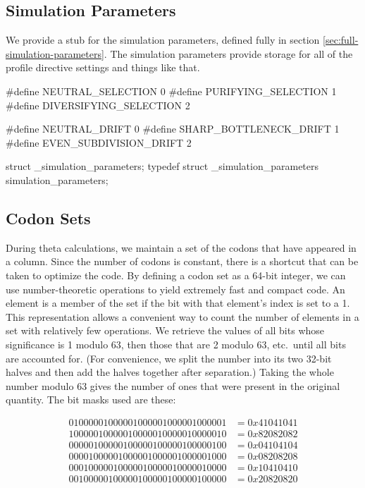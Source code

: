 \documentclass{article}
\begin{document}
    \subsection{Simulation Parameters}
      \label{sec:simulation-parameters}

      We provide a stub for the simulation parameters, defined fully in section
      \ref{sec:full-simulation-parameters}. The simulation parameters provide
      storage for all of the profile directive settings and things like that.

\begin{ccode}
#define NEUTRAL_SELECTION 0
#define PURIFYING_SELECTION 1
#define DIVERSIFYING_SELECTION 2

#define NEUTRAL_DRIFT 0
#define SHARP_BOTTLENECK_DRIFT 1
#define EVEN_SUBDIVISION_DRIFT 2

struct _simulation_parameters;
typedef struct _simulation_parameters simulation_parameters;
\end{ccode}

    \subsection{Codon Sets}
      \label{sec:codon-sets}

      During theta calculations, we maintain a set of the codons that have
      appeared in a column. Since the number of codons is constant, there is a
      shortcut that can be taken to optimize the code. By defining a codon set
      as a 64-bit integer, we can use number-theoretic operations to yield
      extremely fast and compact code. An element is a member of the set if the
      bit with that element's index is set to a 1. This representation allows a
      convenient way to count the number of elements in a set with relatively
      few operations. We retrieve the values of all bits whose significance is 1
      modulo 63, then those that are 2 modulo 63, etc.\ until all bits are
      accounted for. (For convenience, we split the number into its two 32-bit
	  halves and then add the halves together after separation.) Taking the
      whole number modulo 63 gives the number of ones that were present in the
      original quantity. The bit masks used are these:

      \begin{align*}
        01000001000001000001000001000001 & = 0x41041041 \\ %
        10000010000010000010000010000010 & = 0x82082082 \\ %
        00000100000100000100000100000100 & = 0x04104104 \\ %
        00001000001000001000001000001000 & = 0x08208208 \\ %
        00010000010000010000010000010000 & = 0x10410410 \\ %
        00100000100000100000100000100000 & = 0x20820820
      \end{align*}
\end{document}

